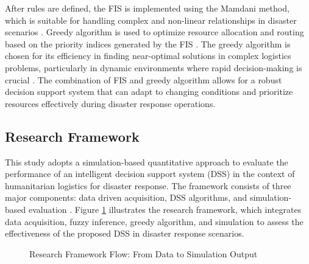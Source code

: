 \documentclass[journal,final,a4paper,twoside,11pt]{IEEEtran}
\begin{document}
After rules are defined, the FIS is implemented using the Mamdani method, which is suitable for handling complex and non-linear relationships in disaster scenarios \cite{herpratiwi2022implementation}. Greedy algorithm is used to optimize resource allocation and routing based on the priority indices generated by the FIS \cite{shirmarz2020adaptive}. The greedy algorithm is chosen for its efficiency in finding near-optimal solutions in complex logistics problems, particularly in dynamic environments where rapid decision-making is crucial \cite{hamidouglu2023game}. The combination of FIS and greedy algorithm allows for a robust decision support system that can adapt to changing conditions and prioritize resources effectively during disaster response operations. 
 

\subsection{Research Framework}

This study adopts a simulation-based quantitative approach to evaluate the performance of an intelligent decision support system (DSS) in the context of humanitarian logistics for disaster response. The framework consists of three major components: data driven acquisition, DSS algorithms, and simulation-based evaluation \cite{mahmoodi2024data}. Figure \ref{fig:research_framework} illustrates the research framework, which integrates data acquisition, fuzzy inference, greedy algorithm, and simulation to assess the effectiveness of the proposed DSS in disaster response scenarios.

\begin{figure}[htbp]
\centering
{}
\caption{Research Framework Flow: From Data to Simulation Output}
\label{fig:research_framework}
\end{figure}
\end{document}
